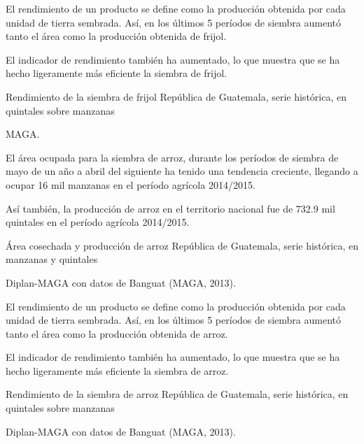 
%
{%
El rendimiento de un producto se define como la producción obtenida por cada unidad de tierra sembrada. Así, en los últimos 5 períodos de siembra aumentó tanto el área como la producción obtenida de frijol.

El indicador de rendimiento también ha aumentado, lo que muestra que se ha hecho ligeramente más eficiente la siembra de frijol. 
}%
{%
	Rendimiento de la siembra de frijol} %
{%
	República de Guatemala, serie histórica, en quintales sobre manzanas } %
{%
	\begin{tikzpicture}[x=1pt,y=1pt]    \end{tikzpicture}}%
{%
	MAGA.} %


%
{%
El área ocupada para la siembra de arroz, durante los períodos de siembra de mayo de un año a abril del siguiente ha tenido una tendencia creciente, llegando a ocupar 16 mil  manzanas en el período agrícola 2014/2015.

Así también, la producción de arroz en el territorio nacional fue de 732.9 mil quintales en el período agrícola 2014/2015.
}%
{%
	Área cosechada y producción de arroz} %
{%
	República de Guatemala, serie histórica, en manzanas y  quintales } %
{%
	\begin{tikzpicture}[x=1pt,y=1pt]    \end{tikzpicture}}%
{%
	Diplan-MAGA con datos de Banguat (MAGA, 2013).} %



%
{%
El rendimiento de un producto se define como la producción obtenida por cada unidad de tierra sembrada. Así, en los últimos 5 períodos de siembra aumentó tanto el área como la producción obtenida de arroz.

El indicador de rendimiento también ha aumentado, lo que muestra que se ha hecho ligeramente más eficiente la siembra de arroz. 
}%
{%
	Rendimiento de la siembra de arroz} %
{%
	República de Guatemala, serie histórica, en quintales sobre manzanas } %
{%
	\begin{tikzpicture}[x=1pt,y=1pt]    \end{tikzpicture}}%
{%
	Diplan-MAGA con datos de Banguat (MAGA, 2013).} %

